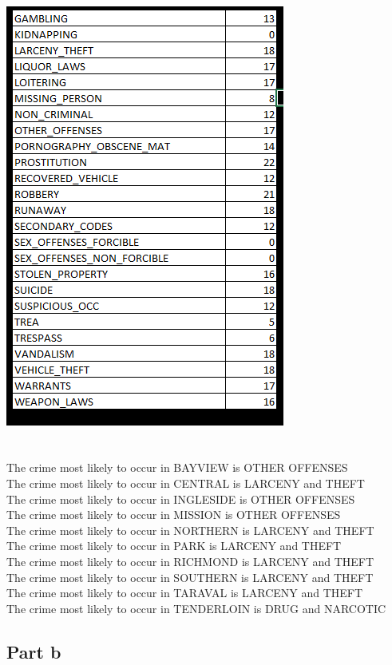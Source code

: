 \documentclass[paper=a4, fontsize=11pt]{scrartcl} %
\numberwithin{equation}{section} %
\numberwithin{figure}{section} %
\numberwithin{table}{section} %
\begin{document}
	\\
	\includegraphics{crimes_hours_2}
	\\\\\\
	The crime most likely to occur in BAYVIEW is OTHER OFFENSES\\
	The crime most likely to occur in CENTRAL is LARCENY and THEFT\\
	The crime most likely to occur in INGLESIDE is OTHER OFFENSES\\
	The crime most likely to occur in MISSION is OTHER OFFENSES\\
	The crime most likely to occur in NORTHERN is LARCENY and THEFT\\
	The crime most likely to occur in PARK is LARCENY and THEFT\\
	The crime most likely to occur in RICHMOND is LARCENY and THEFT\\
	The crime most likely to occur in SOUTHERN is LARCENY and THEFT\\
	The crime most likely to occur in TARAVAL is LARCENY and THEFT\\
	The crime most likely to occur in TENDERLOIN is DRUG and NARCOTIC
	\subsection{Part b}
\end{document}
